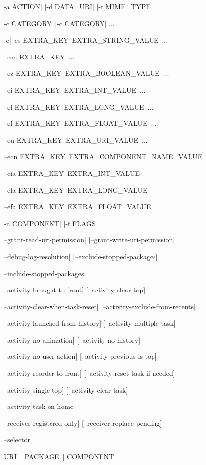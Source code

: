 ﻿\documentclass[a4paper,11pt]{article}
\begin{document}
  \begin{coloredenumerate}
    \item -a \lt ACTION\gt] [-d \lt DATA\_URI\gt] [-t \lt MIME\_TYPE\gt
    \item -c \lt CATEGORY\gt\ [-c \lt CATEGORY\gt] ...
    \item -e|--es \lt EXTRA\_KEY\gt\ \lt EXTRA\_STRING\_VALUE\gt\ ...
    \item --esn \lt EXTRA\_KEY\gt\ ...
    \item --ez \lt EXTRA\_KEY\gt\ \lt EXTRA\_BOOLEAN\_VALUE\gt\ ...
    \item --ei \lt EXTRA\_KEY\gt\ \lt EXTRA\_INT\_VALUE\gt\ ...
    \item --el \lt EXTRA\_KEY\gt\ \lt EXTRA\_LONG\_VALUE\gt\ ...
    \item --ef \lt EXTRA\_KEY\gt\ \lt EXTRA\_FLOAT\_VALUE\gt\ ...
    \item --eu \lt EXTRA\_KEY\gt\ \lt EXTRA\_URI\_VALUE\gt\ ...
    \item --ecn \lt EXTRA\_KEY\gt\ \lt EXTRA\_COMPONENT\_NAME\_VALUE\gt
    \item --eia \lt EXTRA\_KEY\gt\ \lt EXTRA\_INT\_VALUE
    \item --ela \lt EXTRA\_KEY\gt\ \lt EXTRA\_LONG\_VALUE
    \item --efa \lt EXTRA\_KEY\gt\ \lt EXTRA\_FLOAT\_VALUE
    \item -n \lt COMPONENT\gt] [-f \lt FLAGS\gt
    \item --grant-read-uri-permission] [--grant-write-uri-permission]
    \item --debug-log-resolution] [--exclude-stopped-packages]
    \item --include-stopped-packages]
    \item --activity-brought-to-front] [--activity-clear-top]
    \item --activity-clear-when-task-reset] [--activity-exclude-from-recents]
    \item --activity-launched-from-history] [--activity-multiple-task]
    \item --activity-no-animation] [--activity-no-history]
    \item --activity-no-user-action] [--activity-previous-is-top]
    \item --activity-reorder-to-front] [--activity-reset-task-if-needed]
    \item --activity-single-top] [--activity-clear-task]
    \item --activity-task-on-home
    \item --receiver-registered-only] [--receiver-replace-pending]
    \item --selector
    \item \lt URI\gt\ | \lt PACKAGE\gt\ | \lt COMPONENT\gt
  \end{coloredenumerate}
\end{document}
